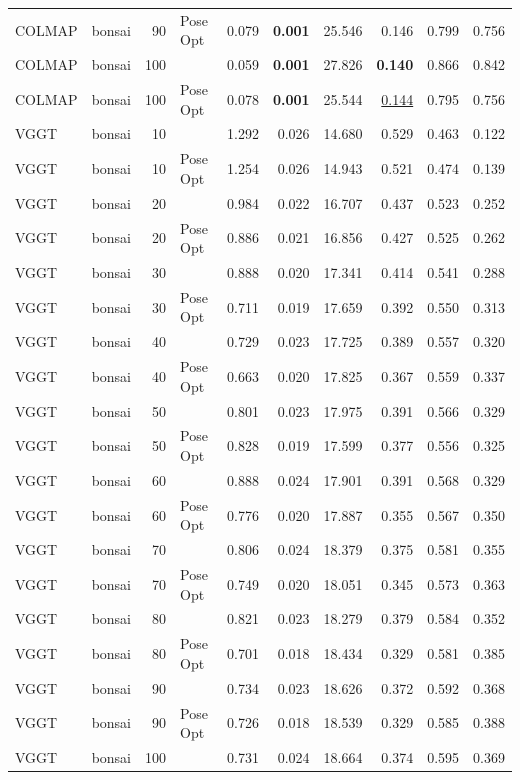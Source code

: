 \begin{table}[H]
\begin{tabular}{llrlrrrrrr}
COLMAP & bonsai & 90 & Pose Opt & 0.079 & \textbf{0.001} & 25.546 & 0.146 & 0.799 & 0.756 \\
COLMAP & bonsai & 100 &  & 0.059 & \textbf{0.001} & 27.826 & \textbf{0.140} & 0.866 & 0.842 \\
COLMAP & bonsai & 100 & Pose Opt & 0.078 & \textbf{0.001} & 25.544 & \underline{0.144} & 0.795 & 0.756 \\
VGGT & bonsai & 10 &  & 1.292 & 0.026 & 14.680 & 0.529 & 0.463 & 0.122 \\
VGGT & bonsai & 10 & Pose Opt & 1.254 & 0.026 & 14.943 & 0.521 & 0.474 & 0.139 \\
VGGT & bonsai & 20 &  & 0.984 & 0.022 & 16.707 & 0.437 & 0.523 & 0.252 \\
VGGT & bonsai & 20 & Pose Opt & 0.886 & 0.021 & 16.856 & 0.427 & 0.525 & 0.262 \\
VGGT & bonsai & 30 &  & 0.888 & 0.020 & 17.341 & 0.414 & 0.541 & 0.288 \\
VGGT & bonsai & 30 & Pose Opt & 0.711 & 0.019 & 17.659 & 0.392 & 0.550 & 0.313 \\
VGGT & bonsai & 40 &  & 0.729 & 0.023 & 17.725 & 0.389 & 0.557 & 0.320 \\
VGGT & bonsai & 40 & Pose Opt & 0.663 & 0.020 & 17.825 & 0.367 & 0.559 & 0.337 \\
VGGT & bonsai & 50 &  & 0.801 & 0.023 & 17.975 & 0.391 & 0.566 & 0.329 \\
VGGT & bonsai & 50 & Pose Opt & 0.828 & 0.019 & 17.599 & 0.377 & 0.556 & 0.325 \\
VGGT & bonsai & 60 &  & 0.888 & 0.024 & 17.901 & 0.391 & 0.568 & 0.329 \\
VGGT & bonsai & 60 & Pose Opt & 0.776 & 0.020 & 17.887 & 0.355 & 0.567 & 0.350 \\
VGGT & bonsai & 70 &  & 0.806 & 0.024 & 18.379 & 0.375 & 0.581 & 0.355 \\
VGGT & bonsai & 70 & Pose Opt & 0.749 & 0.020 & 18.051 & 0.345 & 0.573 & 0.363 \\
VGGT & bonsai & 80 &  & 0.821 & 0.023 & 18.279 & 0.379 & 0.584 & 0.352 \\
VGGT & bonsai & 80 & Pose Opt & 0.701 & 0.018 & 18.434 & 0.329 & 0.581 & 0.385 \\
VGGT & bonsai & 90 &  & 0.734 & 0.023 & 18.626 & 0.372 & 0.592 & 0.368 \\
VGGT & bonsai & 90 & Pose Opt & 0.726 & 0.018 & 18.539 & 0.329 & 0.585 & 0.388 \\
VGGT & bonsai & 100 &  & 0.731 & 0.024 & 18.664 & 0.374 & 0.595 & 0.369 \\

\end{tabular}
\end{table}
